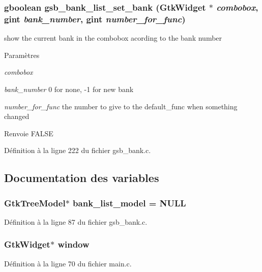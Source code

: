 \subsubsection[{gsb\_\-bank\_\-list\_\-set\_\-bank}]{\setlength{\rightskip}{0pt plus 5cm}gboolean gsb\_\-bank\_\-list\_\-set\_\-bank (GtkWidget $\ast$ {\em combobox}, \/  gint {\em bank\_\-number}, \/  gint {\em number\_\-for\_\-func})}\label{gsb__bank_8c_a3733eb484b3e08e5f313fd7d45bdc1d9}
show the current bank in the combobox acording to the bank number


\begin{DoxyParams}{Paramètres}
\item[{\em combobox}]\item[{\em bank\_\-number}]0 for none, -\/1 for new bank \item[{\em number\_\-for\_\-func}]the number to give to the default\_\-func when something changed\end{DoxyParams}
\begin{DoxyReturn}{Renvoie}
FALSE 
\end{DoxyReturn}


Définition à la ligne 222 du fichier gsb\_\-bank.c.



\subsection{Documentation des variables}
\subsubsection[{bank\_\-list\_\-model}]{\setlength{\rightskip}{0pt plus 5cm}GtkTreeModel$\ast$ {\bf bank\_\-list\_\-model} = NULL}\label{gsb__bank_8c_ae7353d8093723c2b4afba1f49cfaecf0}


Définition à la ligne 87 du fichier gsb\_\-bank.c.

\subsubsection[{window}]{\setlength{\rightskip}{0pt plus 5cm}GtkWidget$\ast$ {\bf window}}\label{gsb__bank_8c_a3d346c08cf2d67c388caabffb412b293}


Définition à la ligne 70 du fichier main.c.

